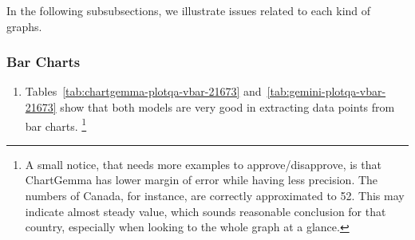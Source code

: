\documentclass[
	letterpaper, %
]{jdf}
\begin{document}
              In the following subsubsections, we illustrate issues related to each kind of graphs.

\subsubsection{Bar Charts}\label{sssect:bar-errors}
\begin{enumerate}
    \item Tables~\ref{tab:chartgemma-plotqa-vbar-21673} and~\ref{tab:gemini-plotqa-vbar-21673} show that both models are very good in extracting data points from bar charts.
        \footnote{A small notice, that needs more examples to approve/disapprove, is that ChartGemma has lower margin of error while having less precision. The numbers of Canada, for instance, are correctly approximated to 52. This may indicate almost steady value, which sounds reasonable conclusion for that country, especially when looking to the whole graph at a glance.}
              \end{enumerate}
\end{document}
